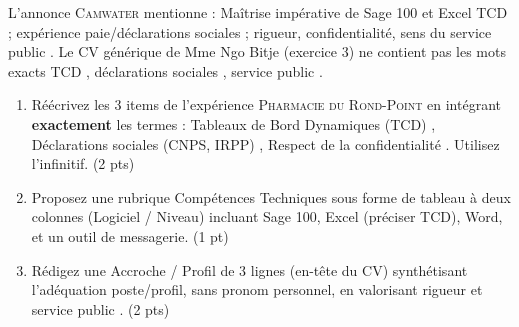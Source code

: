 \documentclass[11pt]{article}
\begin{document}
\begin{exercice}
L'annonce \textsc{Camwater} mentionne : \og Maîtrise impérative de Sage 100 et Excel TCD ; expérience paie/déclarations sociales ; rigueur, confidentialité, sens du service public \fg.
Le CV générique de Mme Ngo Bitje (exercice 3) ne contient pas les mots exacts \og TCD \fg, \og déclarations sociales \fg, \og service public \fg.

\begin{enumerate}
    \item Réécrivez les 3 items de l'expérience \textsc{Pharmacie du Rond-Point} en intégrant \textbf{exactement} les termes : \og Tableaux de Bord Dynamiques (TCD) \fg, \og Déclarations sociales (CNPS, IRPP) \fg, \og Respect de la confidentialité \fg. Utilisez l'infinitif. \hfill (2 pts)
    \item Proposez une rubrique \og Compétences Techniques \fg sous forme de tableau à deux colonnes (Logiciel / Niveau) incluant Sage 100, Excel (préciser TCD), Word, et un outil de messagerie. \hfill (1 pt)
    \item Rédigez une \og Accroche / Profil \fg de 3 lignes (en-tête du CV) synthétisant l'adéquation poste/profil, sans pronom personnel, en valorisant \og rigueur \fg et \og service public \fg. \hfill (2 pts)
\end{enumerate}
\end{exercice}
\end{document}
